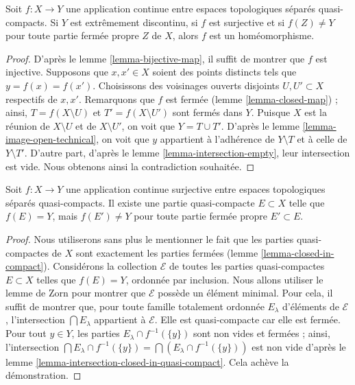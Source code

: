 \begin{lemma}
\label{lemma-isomorphism}
Soit $f : X \to Y$ une application continue entre espaces topologiques
séparés quasi-compacts. Si $Y$ est extrêmement discontinu, si $f$ est
surjective et si $f(Z) \not = Y$ pour toute partie fermée propre $Z$ de $X$,
alors $f$ est un homéomorphisme.
\end{lemma}

\begin{proof}
D'après le lemme \ref{lemma-bijective-map}, il suffit de montrer que $f$ est
injective. Supposons que $x, x' \in X$ soient des points distincts tels que
$y = f(x) = f(x')$. Choisissons des voisinages ouverts disjoints
$U, U' \subset X$ respectifs de $x, x'$. Remarquons que $f$ est fermée
(lemme \ref{lemma-closed-map}) ; ainsi, $T = f(X \setminus U)$ et
$T' = f(X \setminus U')$ sont fermés dans $Y$. Puisque $X$ est la réunion de
$X \setminus U$ et de $X \setminus U'$, on voit que $Y = T \cup T'$.
D'après le lemme \ref{lemma-image-open-technical}, on voit que $y$ appartient
à l'adhérence de $Y \setminus T$ et à celle de $Y \setminus T'$. D'autre part,
d'après le lemme \ref{lemma-intersection-empty}, leur intersection est vide.
Nous obtenons ainsi la contradiction souhaitée.
\end{proof}

\begin{lemma}
\label{lemma-find-compact-subset}
Soit $f : X \to Y$ une application continue surjective entre espaces
topologiques séparés quasi-compacts. Il existe une partie quasi-compacte
$E \subset X$ telle que $f(E) = Y$, mais $f(E') \not = Y$ pour toute partie
fermée propre $E' \subset E$.
\end{lemma}

\begin{proof}
Nous utiliserons sans plus le mentionner le fait que les parties quasi-compactes
de $X$ sont exactement les parties fermées
(lemme \ref{lemma-closed-in-compact}).
Considérons la collection $\mathcal{E}$ de toutes les parties quasi-compactes
$E \subset X$ telles que $f(E) = Y$, ordonnée par inclusion. Nous allons
utiliser le lemme de Zorn pour montrer que $\mathcal{E}$ possède un élément
minimal. Pour cela, il suffit de montrer que, pour toute famille totalement
ordonnée $E_\lambda$ d'éléments de $\mathcal{E}$, l'intersection
$\bigcap E_\lambda$ appartient à $\mathcal{E}$. Elle est quasi-compacte car
elle est fermée. Pour tout $y \in Y$, les parties
$E_\lambda \cap f^{-1}(\{y\})$ sont non vides et fermées ; ainsi, l'intersection
$\bigcap E_\lambda \cap f^{-1}(\{y\}) = \bigcap (E_\lambda \cap f^{-1}(\{y\}))$
est non vide d'après le
lemme \ref{lemma-intersection-closed-in-quasi-compact}.
Cela achève la démonstration.
\end{proof}

